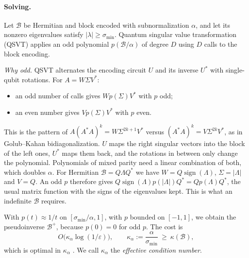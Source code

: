 \documentclass[11pt,a4paper]{article}
\newcommand{\B}{\mathcal{B}}
\theoremstyle{remark}
\begin{document}
\paragraph{Solving.} Let $\B$ be Hermitian and block encoded with subnormalization
$\alpha$, and let its nonzero eigenvalues satisfy $|\lambda|\ge\sigma_{\min}$. Quantum
singular value transformation (QSVT) \cite{GSLW19} applies an odd polynomial
$p(\B/\alpha)$ of degree $D$ using $D$ calls to the block encoding.

\emph{Why odd.} QSVT alternates the encoding circuit $U$ and its inverse $U^*$
with single-qubit rotations. For $A=W\Sigma V^*$:
\begin{itemize}
\item an odd number of calls gives $Wp(\Sigma)V^*$ with $p$ odd;
\item an even number gives $Vp(\Sigma)V^*$ with $p$ even.
\end{itemize}
This is the pattern of $A(A^*A)^k=W\Sigma^{2k+1}V^*$ versus $(A^*A)^k=V\Sigma^{2k}V^*$,
as in Golub--Kahan bidiagonalization. $U$ maps the right singular vectors
into the block of the left ones, $U^*$ maps them back, and the rotations
in between only change the polynomial. Polynomials of mixed parity need a
linear combination of both, which doubles $\alpha$. For Hermitian $\B=Q\Lambda Q^*$ we have $W=Q\operatorname{sign}(\Lambda)$,
$\Sigma=|\Lambda|$ and $V=Q$. An odd $p$ therefore gives
$Q\operatorname{sign}(\Lambda)p(|\Lambda|)Q^*=Qp(\Lambda)Q^*$, the usual matrix function with the
signs of the eigenvalues kept. This is what an indefinite $\B$ requires.

With $p(t)\approx1/t$ on $[\sigma_{\min}/\alpha,1]$, with $p$ bounded on $[-1,1]$, we
obtain the pseudoinverse $\B^+$, because $p(0)=0$ for odd $p$. The cost is
\begin{equation}\label{eq:cost}
O\big(\kappa_\alpha\log(1/\varepsilon)\big),\qquad \kappa_\alpha:=\frac{\alpha}{\sigma_{\min}}\ \ge\ \kappa(\B),
\end{equation}
which is optimal in $\kappa_\alpha$ \cite{CKS17,Costa22}. We call $\kappa_\alpha$ the
\emph{effective condition number}.
\end{document}

